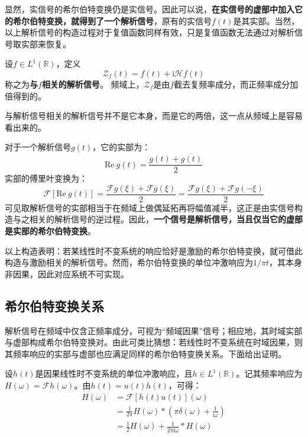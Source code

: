 \documentclass{ctexbook}
\begin{document}
显然，实信号的希尔伯特变换仍是实信号。因此可以说，\textbf{在实信号的虚部中加入它的希尔伯特变换，就得到了一个解析信号}，原有的实信号$f(t)$是其实部。当然，以上解析信号的构造过程对于复值函数同样有效，只是复值函数无法通过对解析信号取实部来恢复。

\begin{definition}
    设$f\in L^1(\mathbb{R})$，定义
    $$\mathcal{Z}_f(t)=f(t)+\mathrm{i}\mathcal{H} f(t)$$
    称之为\textbf{与}$f$\textbf{相关的解析信号}。
    频域上，$\mathcal{Z} _f$是由$f$截去复频率成分，而正频率成分加倍得到的。
\end{definition}

与解析信号相关的解析信号并不是它本身，而是它的两倍，这一点从频域上是容易看出来的。

对于一个解析信号$g(t)$，它的实部为：
$$\text{Re}\ g(t)=\frac{g(t)+\overline{g(t)}}{2}$$
实部的傅里叶变换为：
$$\mathcal{F}[\text{Re}\ g(t)]=\frac{\mathcal{F}g(\xi)+\mathcal{F}\overline{g}(\xi)}{2}=\frac{\mathcal{F}g(\xi)+\mathcal{F}g(-\xi)}{2}$$
可见取解析信号的实部相当于在频域上做偶延拓再将幅值减半，这正是由实信号构造与之相关的解析信号的逆过程。因此，\textbf{一个信号是解析信号，当且仅当它的虚部是实部的希尔伯特变换}。

以上构造表明：若某线性时不变系统的响应恰好是激励的希尔伯特变换，就可借此构造与激励相关的解析信号。然而，希尔伯特变换的单位冲激响应为$1/\pi t$，其本身非因果，因此对应系统不可实现。

\subsection{希尔伯特变换关系}\label{sub:hilbert_relation}

解析信号在频域中仅含正频率成分，可视为“频域因果”信号；相应地，其时域实部与虚部构成希尔伯特变换对。由此可类比猜想：若线性时不变系统在时域因果，则其频率响应的实部与虚部也应满足同样的希尔伯特变换关系。下面给出证明。

设$h(t)$是因果线性时不变系统的单位冲激响应，且$h\in L^1(\mathbb{R})$。记其频率响应为$H(\omega)=\mathcal{F}h(\omega)$。由$h(t)=u(t)h(t)$，可得：
\begin{align*}
    H(\omega)&=\mathcal{F} [h(t)u(t)](\omega)\\
    &=\frac{1}{2\pi}H(\omega)*\left(\pi\delta(\omega)+\frac{1}{\mathrm{i}\omega}\right)\\
    &=\frac{1}{2}H(\omega)+\frac{1}{2\pi \mathrm{i}\omega}*H(\omega)
\end{align*}
\end{document}
